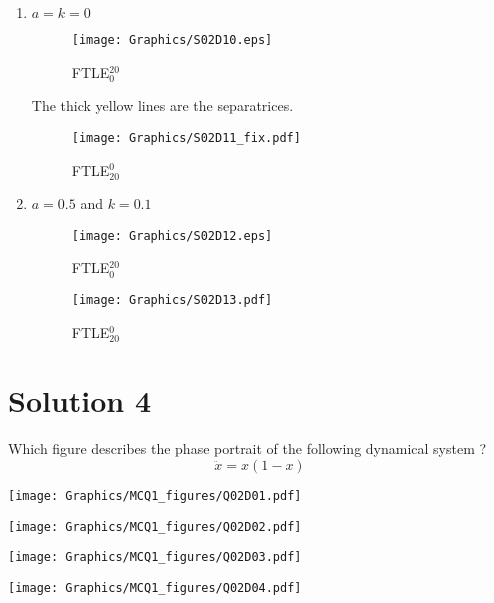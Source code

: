 \documentclass[twoside,10pt,a4paper]{article}
\begin{document}
\newpage

\begin{enumerate}[label=(\arabic*)]
	\item $a = k = 0$
		
		\begin{figure}[H]
			\centering
			\texttt{[image: Graphics/S02D10.eps]}
			\caption{FTLE${}^{20}_0$}
		\end{figure}
		The thick yellow lines are the separatrices. 
		
		\begin{figure}[H]
			\centering
			\texttt{[image: Graphics/S02D11\_fix.pdf]}
			\caption{FTLE${}^{0}_{20}$}
		\end{figure}

	\item $ a = 0.5$ and $k = 0.1$
	\begin{figure}[H]
			\centering
			\texttt{[image: Graphics/S02D12.eps]}
			\caption{FTLE${}^{20}_0$}
		\end{figure}
		
		\begin{figure}[H]
			\centering
			\texttt{[image: Graphics/S02D13.pdf]}
			\caption{FTLE${}^{0}_{20}$}
		\end{figure}

\end{enumerate}

\newpage


\section*{Solution 4}
Which figure describes the phase portrait of the following dynamical system ?
\begin{equation*}
	\ddot{x} = x(1 - x)
\end{equation*}

\begin{enumerate}[label=(\alph*)]
	\item  \texttt{[image: Graphics/MCQ1\_figures/Q02D01.pdf]}
	{\color{MyRed}\item  \texttt{[image: Graphics/MCQ1\_figures/Q02D02.pdf]}}
	
	\item  \texttt{[image: Graphics/MCQ1\_figures/Q02D03.pdf]}
	\item  \texttt{[image: Graphics/MCQ1\_figures/Q02D04.pdf]}
\end{enumerate}
\end{document}
